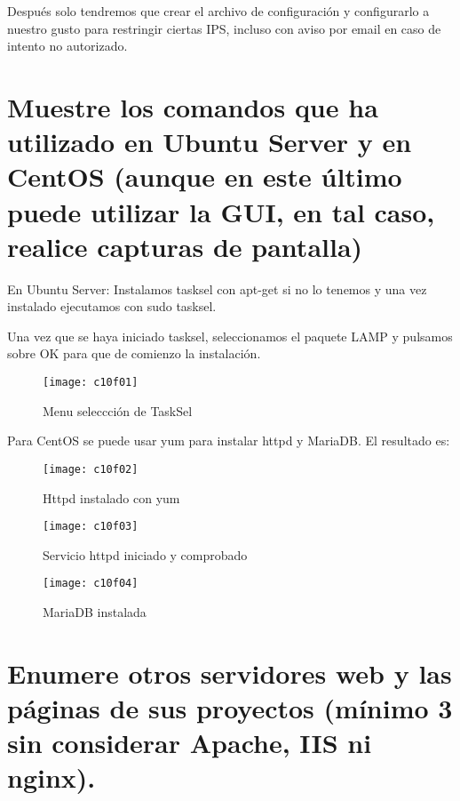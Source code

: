 Después solo tendremos que crear el archivo de configuración y configurarlo a nuestro gusto para restringir ciertas IPS, incluso con aviso por email en caso de intento no autorizado. \cite{09o301} \\



\clearpage
\section{Muestre los comandos que ha utilizado en Ubuntu Server y en CentOS (aunque en este último puede utilizar la GUI, en tal caso, realice capturas de pantalla)}

En Ubuntu Server: Instalamos tasksel con apt-get si no lo tenemos y una vez instalado ejecutamos con sudo tasksel.

Una vez que se haya iniciado tasksel, seleccionamos el paquete LAMP y pulsamos sobre OK para que de comienzo la instalación.


\begin{figure}[H]
	\centering
	\texttt{[image: c10f01]}
	\caption{Menu seleccción de TaskSel}
	\label{fig:c10f01}
\end{figure}

Para CentOS se puede usar yum para instalar httpd y MariaDB. El resultado es: \\
\begin{figure}[H]
	\centering
	\texttt{[image: c10f02]}
	\caption{Httpd instalado con yum}
	\label{fig:c10f02}
\end{figure}
\begin{figure}[H]
	\centering
	\texttt{[image: c10f03]}
	\caption{Servicio httpd iniciado y comprobado}
	\label{fig:c10f03}
\end{figure}
\begin{figure}[H]
	\centering
	\texttt{[image: c10f04]}
	\caption{MariaDB instalada}
	\label{fig:c10f04}
\end{figure}


\section{Enumere otros servidores web y las páginas de sus proyectos (mínimo 3 sin considerar Apache, IIS ni nginx). \cite{11cn01}}

